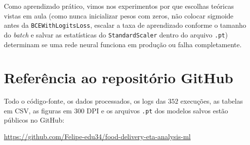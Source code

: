 \documentclass[12pt,a4paper]{article}
\begin{document}
Como aprendizado prático, vimos nos experimentos por que escolhas teóricas vistas em aula (como nunca inicializar pesos com zeros, não colocar sigmoide antes da \texttt{BCEWithLogitsLoss}, escalar a taxa de aprendizado conforme o tamanho do \textit{batch} e salvar as estatísticas do \texttt{StandardScaler} dentro do arquivo \texttt{.pt}) determinam se uma rede neural funciona em produção ou falha completamente.

\section{Referência ao repositório GitHub}

Todo o código-fonte, os dados processados, os logs das $352$ execuções, as tabelas em CSV, as figuras em $300\text{ DPI}$ e os arquivos \texttt{.pt} dos modelos salvos estão públicos no GitHub:
\begin{center}
    \url{https://github.com/Felipe-edu34/food-delivery-eta-analysis-ml}
\end{center}
\end{document}
